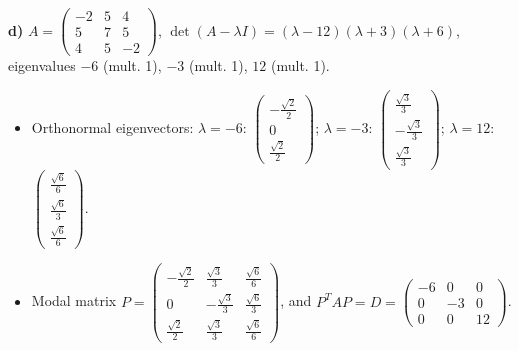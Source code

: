 \noindent\textbf{d)} $A=\begin{pmatrix}-2 & 5 & 4 \\ 5 & 7 & 5 \\ 4 & 5 & -2\end{pmatrix}$, $\det(A-\lambda I)=\left(\lambda - 12\right) \left(\lambda + 3\right) \left(\lambda + 6\right)$, eigenvalues $-6$ (mult. 1), $-3$ (mult. 1), $12$ (mult. 1).
\begin{itemize}\item Orthonormal eigenvectors: $\lambda=-6$: $\begin{pmatrix}- \frac{\sqrt{2}}{2} \\ 0 \\ \frac{\sqrt{2}}{2}\end{pmatrix}$; $\lambda=-3$: $\begin{pmatrix}\frac{\sqrt{3}}{3} \\ - \frac{\sqrt{3}}{3} \\ \frac{\sqrt{3}}{3}\end{pmatrix}$; $\lambda=12$: $\begin{pmatrix}\frac{\sqrt{6}}{6} \\ \frac{\sqrt{6}}{3} \\ \frac{\sqrt{6}}{6}\end{pmatrix}$.
\item Modal matrix $P=\begin{pmatrix}- \frac{\sqrt{2}}{2} & \frac{\sqrt{3}}{3} & \frac{\sqrt{6}}{6} \\ 0 & - \frac{\sqrt{3}}{3} & \frac{\sqrt{6}}{3} \\ \frac{\sqrt{2}}{2} & \frac{\sqrt{3}}{3} & \frac{\sqrt{6}}{6}\end{pmatrix}$, and $P^TAP=D=\begin{pmatrix}-6 & 0 & 0 \\ 0 & -3 & 0 \\ 0 & 0 & 12\end{pmatrix}$.\end{itemize}

